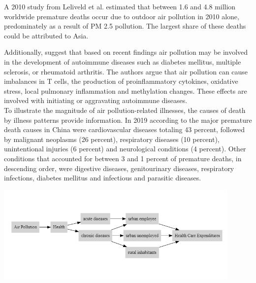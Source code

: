 \documentclass[
]{article}
\begin{document}
	A 2010 study from Leliveld et al. estimated that between 1.6 and 4.8 million worldwide premature deaths occur due to outdoor air pollution in 2010 alone, predominately as a result of PM 2.5 pollution. The largest share of these deaths could be attributed to Asia. 
	
	Additionally, \cite{zhao2019emerging} suggest that based on recent findings air pollution may be involved in the development of autoimmune diseases such as diabetes mellitus, multiple sclerosis, or rheumatoid arthritis. The authors argue that air pollution can cause imbalances in T cells, the production of proinflammatory cytokines, oxidative stress, local pulmonary inflammation and methylation changes. These effects are involved with initiating or aggravating autoimmune diseases. \\ %
	
	To illustrate the magnitude of air pollution-related illnesses, the causes of death by illness patterns provide information. In 2019 according to \cite{who_nodate} the major premature death causes in China were cardiovascular diseases totaling 43 percent, followed by malignant neoplasms (26 percent), respiratory diseases (10 percent), unintentional injuries (6 percent) and neurological conditions (4 percent). Other conditions that accounted for between 3 and 1 percent of premature deaths, in descending order, were digestive diseases, genitourinary diseases, respiratory infections, diabetes mellitus and infectious and parasitic diseases.  %
	\begin{center}
		\includegraphics[width=0.9\textwidth]{DAG_true.png} 
		\label{fig:dag}
	\end{center}
\end{document}

